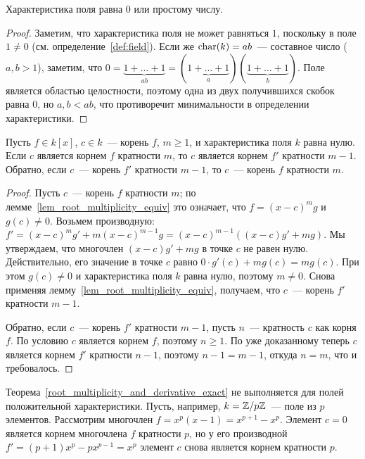 \begin{lemma}
Характеристика поля равна $0$ или простому числу.
\end{lemma}
\begin{proof}
Заметим, что характеристика поля не может равняться $1$, поскольку в
поле $1\neq 0$ (см. определение~\ref{def:field}). Если же
$\operatorname{char}(k)=ab$~--- составное число ($a,b>1$), заметим, что
$0=\underbrace{1+\dots+1}_{ab} =
(\underbrace{1+\dots+1}_a)(\underbrace{1+\dots+1}_b)$. Поле является
областью целостности, поэтому одна из двух получившихся скобок равна
$0$, но $a,b<ab$, что противоречит минимальности в определении
характеристики.
\end{proof}

\begin{theorem}\label{root_multiplicity_and_derivative_exact}
Пусть $f\in k[x]$, $c\in k$~--- корень $f$, $m\geq 1$, и
характеристика поля $k$ равна 
нулю. Если $c$ является корнем $f$ кратности $m$, то $c$ является
корнем $f'$ кратности $m-1$. Обратно, если $c$~--- корень $f'$
кратности $m-1$, то $c$~--- корень $f$ кратности $m$.
\end{theorem}
\begin{proof}
Пусть $c$~--- корень $f$ кратности $m$; по
лемме~\ref{lem_root_multiplicity_equiv} это означает, что
$f=(x-c)^mg$ и $g(c)\neq 0$. Возьмем производную:
$f'=(x-c)^mg'+m(x-c)^{m-1}g=(x-c)^{m-1}((x-c)g'+mg)$. Мы утверждаем,
что многочлен $(x-c)g'+mg$ в точке $c$ не равен нулю. Действительно,
его значение в точке $c$ равно $0\cdot g'(c)+mg(c)=mg(c)$.
При этом $g(c)\neq 0$ и характеристика поля $k$ равна нулю, поэтому
$m\neq 0$. Снова применяя лемму~\ref{lem_root_multiplicity_equiv},
получаем, что $c$~--- корень $f'$ кратности $m-1$.

Обратно, если $c$~--- корень $f'$ кратности $m-1$, пусть $n$~---
кратность $c$ как корня $f$. По условию $c$ является корнем $f$,
поэтому $n\geq 1$. По уже доказанному теперь $c$ является корнем $f'$
кратности $n-1$, поэтому $n-1=m-1$, откуда $n=m$, что и требовалось.
\end{proof}

\begin{remark}
Теорема~\ref{root_multiplicity_and_derivative_exact} не выполняется
для полей положительной характеристики. Пусть, например,
$k = \mathbb Z/p\mathbb Z$~--- поле из $p$ элементов. Рассмотрим многочлен
$f = x^p(x-1) = x^{p+1} - x^p$. Элемент $c = 0$ является корнем
многочлена $f$ кратности $p$, но у его
производной $f' = (p+1)x^p - px^{p-1} = x^p$ элемент $c$ снова
является корнем кратности $p$.
\end{remark}


